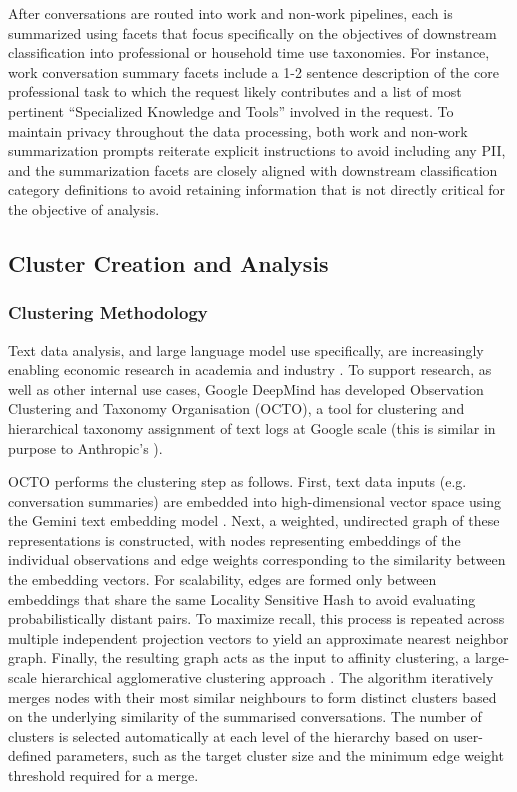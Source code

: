 \documentclass[11pt,a4paper]{article}
\begin{document}
After conversations are routed into work and non-work pipelines, each is summarized using facets that focus specifically on the objectives of downstream classification into professional or household time use taxonomies. For instance, work conversation summary facets include a 1-2 sentence description of the core professional task to which the request likely contributes and a list of most pertinent ``Specialized Knowledge and Tools'' involved in the request. To maintain privacy throughout the data processing, both work and non-work summarization prompts reiterate explicit instructions to avoid including any PII, and the summarization facets are closely aligned with downstream classification category definitions to avoid retaining information that is not directly critical for the objective of analysis.

\subsection{Cluster Creation and Analysis}
\label{app:app_1_2}

\subsubsection{Clustering Methodology}
Text data analysis, and large language model use specifically, are increasingly enabling economic research in academia \citep{10.1257/jel.20181020, 10.1257/jel.20231736, NBERw33941} and industry \citep{tamkin2024clioprivacypreservinginsightsrealworld, Eloundou2024, tomlinson2025workingaimeasuringapplicability,verma2026how,NBERw34255}. To support research, as well as other internal use cases, Google DeepMind has developed Observation Clustering and Taxonomy Organisation (OCTO), a tool for clustering and hierarchical taxonomy assignment of text logs at Google scale (this is similar in purpose to Anthropic's \citet{tamkin2024clioprivacypreservinginsightsrealworld}).

OCTO performs the clustering step as follows. First, text data inputs (e.g. conversation summaries) are embedded into high-dimensional vector space using the Gemini text embedding model \citep{https://doi.org/10.48550/arxiv.2503.07891}. Next, a weighted, undirected graph of these representations is constructed, with nodes representing embeddings of the individual observations and edge weights corresponding to the similarity between the embedding vectors. For scalability, edges are formed only between embeddings that share the same Locality Sensitive Hash \citep[SimHash,][]{Charikar2002} to avoid evaluating probabilistically distant pairs. To maximize recall, this process is repeated across multiple independent projection vectors to yield an approximate nearest neighbor graph. Finally, the resulting graph acts as the input to affinity clustering, a large-scale hierarchical agglomerative clustering approach \citep{46700}. The algorithm iteratively merges nodes with their most similar neighbours to form distinct clusters based on the underlying similarity of the summarised conversations. The number of clusters is selected automatically at each level of the hierarchy based on user-defined parameters, such as the target cluster size and the minimum edge weight threshold required for a merge.
\end{document}
